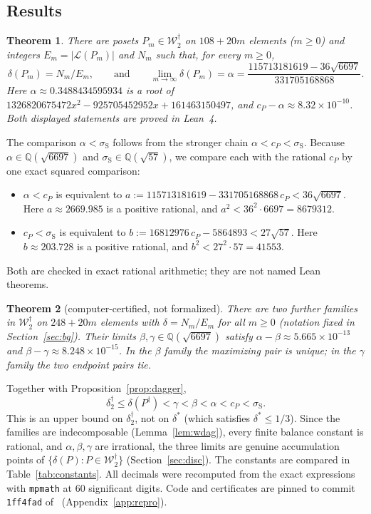 \documentclass[11pt]{amsart}
\newtheorem{theorem}{Theorem}[section]
\theoremstyle{definition}
\theoremstyle{remark}
\newcommand{\Lin}{\mathcal{L}}
\newcommand{\Wdag}{\mathcal{W}_2^{\dagger}}
\newcommand{\deltadag}{\delta_2^{\dagger}}
\newcommand{\pin}{1ff4fad}
\begin{document}
\subsection*{Results}
\begin{theorem}\label{thm:main}
There are posets $P_m\in\Wdag$ on $108+20m$ elements ($m\ge0$) and integers $E_m=|\Lin(P_m)|$ and $N_m$ such that, for every $m\ge 0$,
\[
\delta(P_m)=N_m/E_m,
\qquad\text{and}\qquad
\lim_{m\to\infty}\delta(P_m)=\alpha=\frac{115713181619-36\sqrt{6697}}{331705168868}.
\]
Here $\alpha\approx0.3488434595934$ is a root of $1326820675472x^2-925705452952x+161463150497$, and $c_P-\alpha\approx 8.32\times10^{-10}$. Both displayed statements are proved in Lean~4.
\end{theorem}

The comparison $\alpha<\sigma_{\mathrm S}$ follows from the stronger chain $\alpha<c_P<\sigma_{\mathrm S}$. Because $\alpha\in\mathbb{Q}(\sqrt{6697})$ and $\sigma_{\mathrm S}\in\mathbb{Q}(\sqrt{57})$, we compare each with the rational $c_P$ by one exact squared comparison:
\begin{itemize}
\item $\alpha<c_P$ is equivalent to $a:=115713181619-331705168868\,c_P<36\sqrt{6697}$. Here $a\approx2669.985$ is a positive rational, and $a^2<36^2\cdot6697=8679312$.
\item $c_P<\sigma_{\mathrm S}$ is equivalent to $b:=16812976\,c_P-5864893<27\sqrt{57}$. Here $b\approx203.728$ is a positive rational, and $b^2<27^2\cdot57=41553$.
\end{itemize}
Both are checked in exact rational arithmetic; they are not named Lean theorems.

\begin{theorem}[computer-certified, not formalized]\label{thm:betagamma}
There are two further families in $\Wdag$ on $248+20m$ elements with $\delta=N_m/E_m$ for all $m\ge0$ (notation fixed in Section~\ref{sec:bg}). Their limits $\beta,\gamma\in\mathbb{Q}(\sqrt{6697})$ satisfy $\alpha-\beta\approx5.665\times10^{-13}$ and $\beta-\gamma\approx 8.248\times10^{-15}$. In the $\beta$ family the maximizing pair is unique; in the $\gamma$ family the two endpoint pairs tie.
\end{theorem}

Together with Proposition~\ref{prop:dagger},
\[
\deltadag\le\delta(P^\dagger)<\gamma<\beta<\alpha<c_P<\sigma_{\mathrm S}.
\]
This is an upper bound on $\deltadag$, not on $\delta^*$ (which satisfies $\delta^*\le1/3$). Since the families are indecomposable (Lemma~\ref{lem:wdag}), every finite balance constant is rational, and $\alpha,\beta,\gamma$ are irrational, the three limits are genuine accumulation points of $\{\delta(P):P\in\Wdag\}$ (Section~\ref{sec:disc}). The constants are compared in Table~\ref{tab:constants}. All decimals were recomputed from the exact expressions with \texttt{mpmath} at $60$ significant digits. Code and certificates are pinned to commit \texttt{\pin} of~\cite{repo} (Appendix~\ref{app:repro}).
\end{document}
